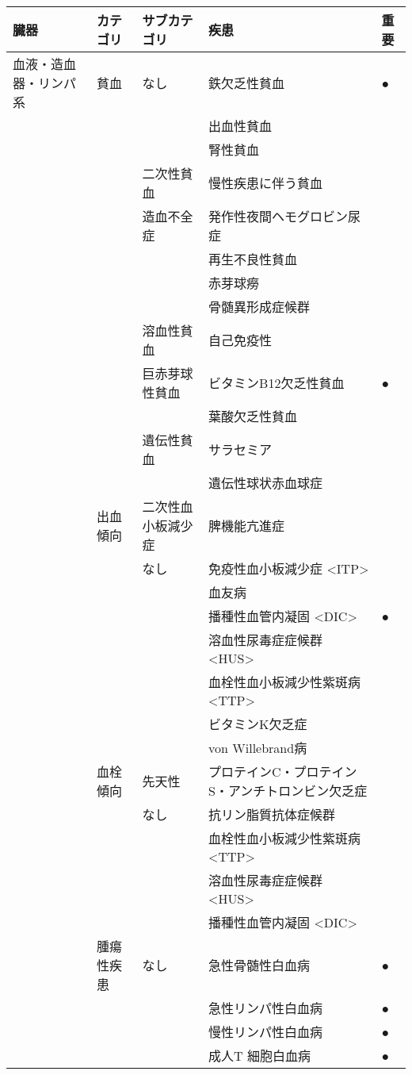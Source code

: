 \begin{xltabular}{\linewidth}{XXXXX}
\caption{\label{tbl:diseases}} \\
\toprule
臓器 & カテゴリ & サブカテゴリ & 疾患 & 重要 \\
\midrule
\endhead
血液・造血器・リンパ系 & 貧血 & なし & 鉄欠乏性貧血 & ● \\
 &  &  & 出血性貧血 &  \\
 &  &  & 腎性貧血 &  \\
 &  & 二次性貧血 & 慢性疾患に伴う貧血 &  \\
 &  & 造血不全症 & 発作性夜間ヘモグロビン尿症 &  \\
 &  &  & 再生不良性貧血 &  \\
 &  &  & 赤芽球癆 &  \\
 &  &  & 骨髄異形成症候群 &  \\
 &  & 溶血性貧血 & 自己免疫性 &  \\
 &  & 巨赤芽球性貧血 & ビタミンB12欠乏性貧血 & ● \\
 &  &  & 葉酸欠乏性貧血 &  \\
 &  & 遺伝性貧血 & サラセミア &  \\
 &  &  & 遺伝性球状赤血球症 &  \\
 & 出血傾向 & 二次性血小板減少症 & 脾機能亢進症 &  \\
 &  & なし & 免疫性血小板減少症 <ITP> &  \\
 &  &  & 血友病 &  \\
 &  &  & 播種性血管内凝固 <DIC> & ● \\
 &  &  & 溶血性尿毒症症候群 <HUS> &  \\
 &  &  & 血栓性血小板減少性紫斑病 <TTP> &  \\
 &  &  & ビタミンK欠乏症 &  \\
 &  &  & von Willebrand病 &  \\
 & 血栓傾向 & 先天性 & プロテインC・プロテインS・アンチトロンビン欠乏症 &  \\
 &  & なし & 抗リン脂質抗体症候群 &  \\
 &  &  & 血栓性血小板減少性紫斑病 <TTP> &  \\
 &  &  & 溶血性尿毒症症候群 <HUS> &  \\
 &  &  & 播種性血管内凝固 <DIC> &  \\
 & 腫瘍性疾患 & なし & 急性骨髄性白血病 & ● \\
 &  &  & 急性リンパ性白血病 & ● \\
 &  &  & 慢性リンパ性白血病 & ● \\
 &  &  & 成人T 細胞白血病 & ● \\

\end{xltabular}
